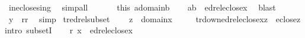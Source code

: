 \begin{isabellebody}
\ in{\isacharunderscore}{\kern0pt}eclose{\isacharunderscore}{\kern0pt}sing\ \isamarkupfalse%
\ simp{\isacharunderscore}{\kern0pt}all\isanewline
\ \ \isamarkupfalse%
\isanewline
\ \ \isamarkupfalse%
\ this\ {\isacartoucheopen}a{\isasymin}domain{\isacharparenleft}{\kern0pt}b{\isacharparenright}{\kern0pt}{\isacartoucheclose}\isanewline
\ \ \isamarkupfalse%
\ {\isachardoublequoteopen}{\isasymlangle}a{\isacharcomma}{\kern0pt}b{\isasymrangle}\ {\isasymin}\ edrel{\isacharparenleft}{\kern0pt}eclose{\isacharparenleft}{\kern0pt}{\isacharbraceleft}{\kern0pt}x{\isacharbraceright}{\kern0pt}{\isacharparenright}{\kern0pt}{\isacharparenright}{\kern0pt}{\isachardoublequoteclose}\ \isamarkupfalse%
\ blast\isanewline
\ \ \isamarkupfalse%
\isanewline
\ \ \isamarkupfalse%
\ {\isachardoublequoteopen}y\ {\isasymin}\ {\isacharquery}{\kern0pt}rr{\isachardoublequoteclose}\ \isamarkupfalse%
\ simp\isanewline
{}\isamarkupfalse%
%
\endisatagproof
{\isafoldproof}%
%
\isadelimproof
\isanewline
%
\endisadelimproof
\isanewline
{}\isamarkupfalse%
\ tr{\isacharunderscore}{\kern0pt}edrel{\isacharunderscore}{\kern0pt}subset\ {\isacharcolon}{\kern0pt}\isanewline
\ \ \ {\isachardoublequoteopen}z\ {\isasymin}\ domain{\isacharparenleft}{\kern0pt}x{\isacharparenright}{\kern0pt}{\isachardoublequoteclose}\isanewline
\ \ \ \ \ {\isachardoublequoteopen}tr{\isacharunderscore}{\kern0pt}down{\isacharparenleft}{\kern0pt}edrel{\isacharparenleft}{\kern0pt}eclose{\isacharparenleft}{\kern0pt}{\isacharbraceleft}{\kern0pt}x{\isacharbraceright}{\kern0pt}{\isacharparenright}{\kern0pt}{\isacharparenright}{\kern0pt}{\isacharcomma}{\kern0pt}z{\isacharparenright}{\kern0pt}\ {\isasymsubseteq}\ eclose{\isacharparenleft}{\kern0pt}{\isacharbraceleft}{\kern0pt}z{\isacharbraceright}{\kern0pt}{\isacharparenright}{\kern0pt}{\isachardoublequoteclose}\isanewline
%
\isadelimproof
%
\endisadelimproof
%
\isatagproof
{}\isamarkupfalse%
{\isacharparenleft}{\kern0pt}intro\ subsetI{\isacharparenright}{\kern0pt}\isanewline
\ \ \isamarkupfalse%
\ {\isacharquery}{\kern0pt}r{\isacharequal}{\kern0pt}{\isachardoublequoteopen}{\isasymlambda}\ x\ {\isachardot}{\kern0pt}\ edrel{\isacharparenleft}{\kern0pt}eclose{\isacharparenleft}{\kern0pt}{\isacharbraceleft}{\kern0pt}x{\isacharbraceright}{\kern0pt}{\isacharparenright}{\kern0pt}{\isacharparenright}{\kern0pt}{\isachardoublequoteclose}\isanewline
\ \ \isamarkupfalse%

\end{isabellebody}
